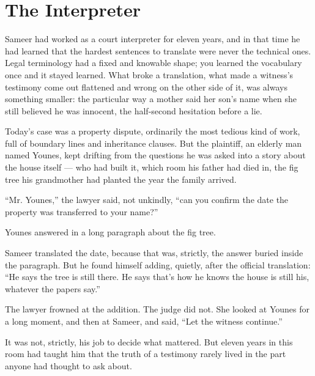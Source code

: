 \chapter{The Interpreter}

Sameer had worked as a court interpreter for eleven years, and in that
time he had learned that the hardest sentences to translate were never
the technical ones. Legal terminology had a fixed and knowable shape;
you learned the vocabulary once and it stayed learned. What broke a
translation, what made a witness's testimony come out flattened and
wrong on the other side of it, was always something smaller: the
particular way a mother said her son's name when she still believed he
was innocent, the half-second hesitation before a lie.

Today's case was a property dispute, ordinarily the most tedious kind
of work, full of boundary lines and inheritance clauses. But the
plaintiff, an elderly man named Younes, kept drifting from the
questions he was asked into a story about the house itself — who had
built it, which room his father had died in, the fig tree his
grandmother had planted the year the family arrived.

``Mr. Younes,'' the lawyer said, not unkindly, ``can you confirm the
date the property was transferred to your name?''

Younes answered in a long paragraph about the fig tree.

Sameer translated the date, because that was, strictly, the answer
buried inside the paragraph. But he found himself adding, quietly,
after the official translation: ``He says the tree is still there. He
says that's how he knows the house is still his, whatever the papers
say.''

The lawyer frowned at the addition. The judge did not. She looked at
Younes for a long moment, and then at Sameer, and said, ``Let the
witness continue.''

It was not, strictly, his job to decide what mattered. But eleven
years in this room had taught him that the truth of a testimony rarely
lived in the part anyone had thought to ask about.

